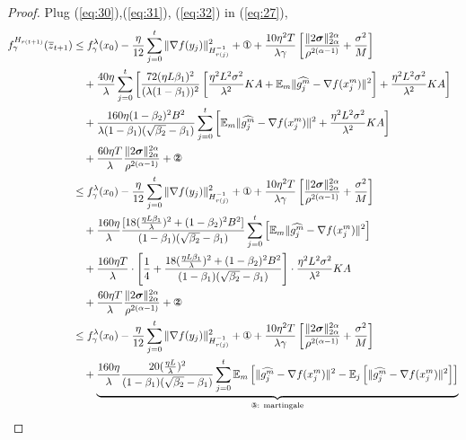 \documentclass{article} %
\numberwithin{equation}{section}
\newcommand{\cirone}{\text{\ding{172}}}
\newcommand{\cirtwo}{\text{\ding{173}}}
\newcommand{\cirthree}{\text{\ding{174}}}
\renewcommand{\eqref}[1]{(\ref{#1})}
\begin{document}
\begin{proof}
    Plug \eqref{eq:30},\eqref{eq:31}, \eqref{eq:32} in \eqref{eq:27},
    \begin{equation}
        \begin{aligned}
            f_\gamma^{H_{r(t+1)}}(\overline{z}_{t+1})
            &\leq f_\gamma^{\lambda}(x_0) - \frac{\eta}{12} \sum_{j=0}^t\|\nabla f(y_j)\|_{H_{r(j)}^{-1}}^2 + \cirone + \frac{10\eta^2T}{\lambda\gamma}\left[\frac{\|2\boldsymbol{\sigma}\|_{2\alpha}^{2\alpha}}{\rho^{2(\alpha-1)}}+\frac{\sigma^2}{M}\right] \\
            &\quad + \frac{40\eta}{\lambda} \sum_{j=0}^t\left[ \frac{72(\eta L\beta_1)^2}{(\lambda(1-\beta_1))^2}\left[\frac{\eta^2L^2\sigma^2}{\lambda^2}KA + \expect_m\|\widehat{g_j^m}-\nabla f(x_j^m)\|^2\right] + \frac{\eta^2L^2\sigma^2}{\lambda^2} KA\right] \\
            &\quad + \frac{160\eta(1-\beta_2)^2B^2}{\lambda(1-\beta_1)(\sqrt{\beta_2}-\beta_1)}
            \sum_{j=0}^t\left[\expect_m\|\widehat{g_j^m}-\nabla f(x_j^m)\|^2 + \frac{\eta^2L^2\sigma^2}{\lambda^2}KA\right] \\
            &\quad + \frac{60\eta T}{\lambda} \frac{\|2\boldsymbol{\sigma}\|_{2\alpha}^{2\alpha}}{\rho^{2(\alpha-1)}} +\cirtwo \\
            &\leq f_\gamma^{\lambda}(x_0) - \frac{\eta}{12} \sum_{j=0}^t\|\nabla f(y_j)\|_{H_{r(j)}^{-1}}^2 + \cirone + \frac{10\eta^2T}{\lambda\gamma}\left[\frac{\|2\boldsymbol{\sigma}\|_{2\alpha}^{2\alpha}}{\rho^{2(\alpha-1)}}+\frac{\sigma^2}{M}\right] \\
            &\quad + \frac{160\eta}{\lambda}\frac{[18(\frac{\eta L\beta_1}{\lambda})^2+(1-\beta_2)^2B^2]}{(1-\beta_1)(\sqrt{\beta_2}-\beta_1)} \sum_{j=0}^t\left[\expect_m\|\widehat{g_j^m}-\nabla f(x_j^m)\|^2\right] \\
            &\quad + \frac{160\eta T}{\lambda}\cdot \left[\frac{1}{4}+\frac{18(\frac{\eta L\beta_1}{\lambda})^2+(1-\beta_2)^2B^2}{(1-\beta_1)(\sqrt{\beta_2}-\beta_1)}\right] \cdot \frac{\eta^2L^2\sigma^2}{\lambda^2}KA \\
            &\quad + \frac{60\eta T}{\lambda} \frac{\|2\boldsymbol{\sigma}\|_{2\alpha}^{2\alpha}}{\rho^{2(\alpha-1)}} +\cirtwo \\
            &\leq f_\gamma^{\lambda}(x_0) - \frac{\eta}{12} \sum_{j=0}^t\|\nabla f(y_j)\|_{H_{r(j)}^{-1}}^2 + \cirone + \frac{10\eta^2T}{\lambda\gamma}\left[\frac{\|2\boldsymbol{\sigma}\|_{2\alpha}^{2\alpha}}{\rho^{2(\alpha-1)}}+\frac{\sigma^2}{M}\right] \\
            &\quad + \underbrace{\frac{160\eta}{\lambda}\frac{20(\frac{\eta L}{\lambda})^2}{(1-\beta_1)(\sqrt{\beta_2}-\beta_1)} \sum_{j=0}^t\expect_m\left[\|\widehat{g_j^m}-\nabla f(x_j^m)\|^2-\expect_j\left[\|\widehat{g_j^m}-\nabla f(x_j^m)\|^2\right]\right]}_{\cirthree\text{: martingale}} \\

\end{aligned}
\end{equation}
\end{proof}
\end{document}
